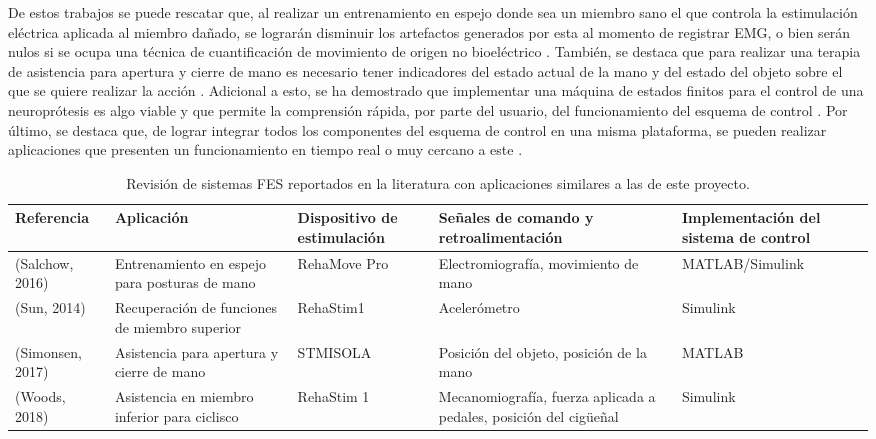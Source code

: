 De estos trabajos se puede rescatar que, al realizar un entrenamiento en espejo donde sea un miembro sano el que controla la estimulación eléctrica aplicada al miembro dañado, se lograrán disminuir los artefactos generados por esta al momento de registrar EMG, o bien serán nulos si se ocupa una técnica de cuantificación de movimiento de origen no bioeléctrico \cite{Salchow2016}. También, se destaca que para realizar una terapia de asistencia para apertura y cierre de mano es necesario tener indicadores del estado actual de la mano y del estado del objeto sobre el que se quiere realizar la acción \cite{Simonsen2017}. Adicional a esto, se ha demostrado que implementar una máquina de estados finitos para el control de una neuroprótesis es algo viable y que permite la comprensión rápida, por parte del usuario, del funcionamiento del esquema de control \cite{Sun2014}. Por último, se destaca que, de lograr integrar todos los componentes del esquema de control en una misma plataforma, se pueden realizar aplicaciones que presenten un funcionamiento en tiempo real o muy cercano a este \cite{Salchow2016}\cite{Sun2014}\cite{Woods2018}.

\begin{table}[hbt]
	\centering
	\begin{tabular}{|p{25mm}|p{35mm}|p{25mm}|p{40mm}|p{35mm}|}
	\hline
	\textbf{Referencia} & \textbf{Aplicación} & \textbf{Dispositivo de estimulación} & \textbf{Señales de comando y retroalimentación} & \textbf{Implementación del sistema de control}\\ 
	\hline
	(Salchow, 2016) & Entrenamiento en espejo para posturas de mano & RehaMove Pro & Electromiografía, movimiento de mano & MATLAB/Simulink\\
	\hline
	(Sun, 2014) & Recuperación de funciones de miembro superior & RehaStim1 & Acelerómetro & Simulink\\
	\hline
	(Simonsen, 2017) & Asistencia para apertura y cierre de mano & STMISOLA & Posición del objeto, posición de la mano & MATLAB\\
	\hline
	(Woods, 2018) & Asistencia en miembro inferior para ciclisco & RehaStim 1 & Mecanomiografía, fuerza aplicada a pedales, posición del cigüeñal & Simulink\\
	\hline
	\end{tabular}
	\centering
	\caption{Revisión de sistemas FES reportados en la literatura con aplicaciones similares a las de este proyecto.}
	\label{Cuadro:Sistemas FES}
\end{table}